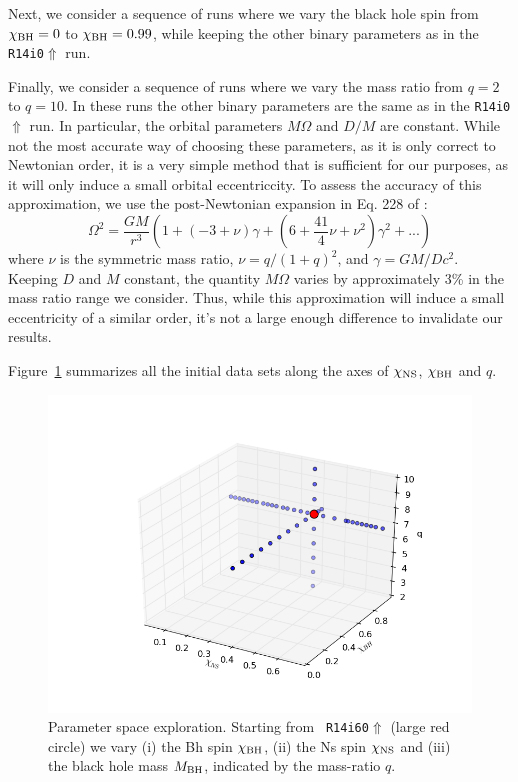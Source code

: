 Next, we consider a sequence of runs where we vary the black hole spin
from $\chi_{\rm BH}=0$ to $\chi_{\rm BH}=0.99$, while keeping the other binary parameters as in the {\tt R14i0$\Uparrow$} run.

Finally, we consider a sequence of runs where we vary the mass ratio
from $q=2$ to $q=10$. In these runs the other binary parameters are
the same as in the {\tt R14i0$\Uparrow$} run. In particular, the
orbital parameters $M\Omega$ and $D/M$ are constant. While not the
most accurate way of choosing these parameters, as it is only correct to Newtonian order, it is a very simple method
that is sufficient for our purposes, as it will only induce a small orbital eccentriccity. To assess the accuracy of this approximation, we use the post-Newtonian expansion in Eq. 228 of \cite{Blanchet2006}:
\begin{equation}
\Omega^2=\frac{GM}{r^3}\left(1+(-3+\nu)\gamma+\left(6+\frac{41}{4}\nu+\nu^2\right)\gamma^2+...\right)
\end{equation}
where $\nu$ is the symmetric mass ratio, $\nu=q/(1+q)^2$, and $\gamma=GM/Dc^2$. Keeping $D$ and $M$ constant, the quantity $M\Omega$ varies by approximately 3\% in the mass ratio range we consider.
Thus, while this approximation will induce a small eccentricity of a similar order, it's not a large enough difference to invalidate our results.

Figure~\ref{fig:3dparam} summarizes all the initial data sets along the axes of $\chi_{\rm NS}$, $\chi_{\rm BH}$ and $q$.

\begin{figure}
\includegraphics[width=0.95\columnwidth]{chap4/3dparam.png}
\caption[3d parameter space plot of Bh-Ns initial data sets.]{\label{fig:3dparam}
Parameter space exploration. Starting from {\tt
  R14i60$\Uparrow$} (large red circle) we vary (i) the Bh spin
$\chi_{\rm BH}$, (ii) the Ns spin $\chi_{\rm NS}$ and (iii) the black
hole mass $M_{\rm BH}$, indicated by the mass-ratio $q$.}
\end{figure}

